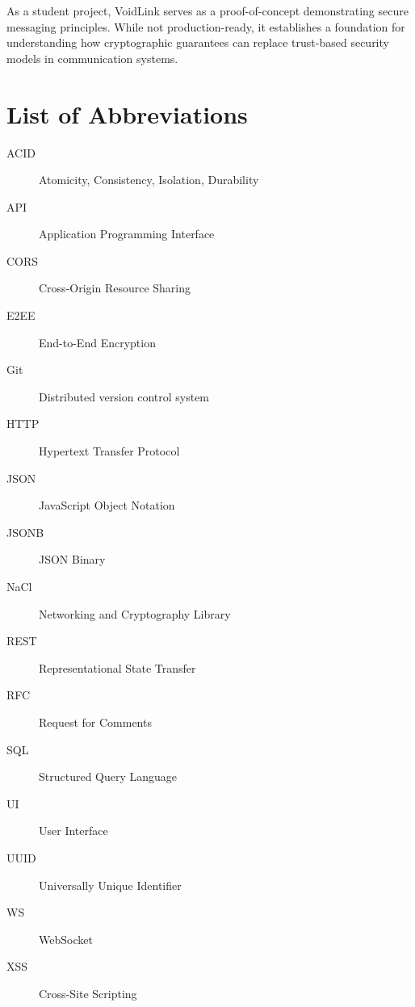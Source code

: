 \documentclass[12pt,a4paper,openany]{book}
\begin{document}
As a student project, VoidLink serves as a proof-of-concept demonstrating secure messaging principles. While not production-ready, it establishes a foundation for understanding how cryptographic guarantees can replace trust-based security models in communication systems.

\newpage
\pagestyle{frontmatter} %
\tableofcontents
\thispagestyle{frontmatter} %


\newpage
\pagestyle{frontmatter}  %
\listoffigures
\thispagestyle{frontmatter}  %

\newpage
\pagestyle{frontmatter}  %
\listoftables
\thispagestyle{frontmatter}  %

\newpage
\pagestyle{frontmatter}  %

\chapter*{List of Abbreviations}
\thispagestyle{frontmatter}  %

\begin{description}
\item[ACID] Atomicity, Consistency, Isolation, Durability
\item[API] Application Programming Interface
\item[CORS] Cross-Origin Resource Sharing
\item[E2EE] End-to-End Encryption
\item[Git] Distributed version control system
\item[HTTP] Hypertext Transfer Protocol
\item[JSON] JavaScript Object Notation
\item[JSONB] JSON Binary
\item[NaCl] Networking and Cryptography Library
\item[REST] Representational State Transfer
\item[RFC] Request for Comments
\item[SQL] Structured Query Language
\item[UI] User Interface
\item[UUID] Universally Unique Identifier
\item[WS] WebSocket
\item[XSS] Cross-Site Scripting
\end{description}
\end{document}
